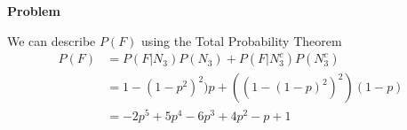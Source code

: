 \documentclass[12pt]{article}
\newenvironment{Ex}{\textbf{Problem}\vspace{.75em}\\}{}
\begin{document}
\begin{enumerate}
\begin{Ex}
\begin{solution}
\begin{enumerate}
          We can describe $P(F)$ using the Total Probability Theorem
          \begin{equation}
            \label{eq:9b-sol}
            \begin{aligned}
              P(F) &= P(F | N_3)P(N_3) + P(F | N_3^c)P(N_3^c) \\
              &= 1-(1-p^2)^2)p + ((1-(1-p)^2)^2)(1-p) \\
              &= -2 p^5+5 p^4-6 p^3+4 p^2-p+1
            \end{aligned}
          \end{equation}
        \end{enumerate}
      \end{solution}
    \end{Ex}
\end{enumerate}
\end{document}
